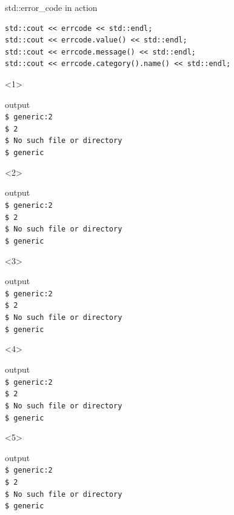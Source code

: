 \documentclass[10pt]{beamer}
\begin{document}
\begin{frame}[fragile]{std::error\_code in action}
\begin{onlyenv}
\begin{verbatim}
std::cout << errcode << std::endl;
std::cout << errcode.value() << std::endl;
std::cout << errcode.message() << std::endl;
std::cout << errcode.category().name() << std::endl;
	\end{verbatim}
	\end{onlyenv}
	
	\hrulefill
	
	\begin{onlyenv}
	\begin{block}{output}
	\texttt{\\
		\$ generic:2 \\
		\$ 2 \\
		\$ No such file or directory \\
		\$ generic}	
	\end{block}
	\end{onlyenv}

	\begin{onlyenv}
	\begin{block}{output}
	\texttt{\\
		\$ \alert{generic:2} \\
		\$ 2 \\
		\$ No such file or directory \\
		\$ generic}	
	\end{block}
	\end{onlyenv}
	
	\begin{onlyenv}
	\begin{block}{output}
	\texttt{\\
		\$ generic:2 \\
		\$ \alert{2} \\
		\$ No such file or directory \\
		\$ generic}	
	\end{block}
	\end{onlyenv}

	\begin{onlyenv}
	\begin{block}{output}
	\texttt{\\
		\$ generic:2 \\
		\$ 2 \\
		\$ \alert{No such file or directory} \\
		\$ generic}	
	\end{block}
	\end{onlyenv}

	\begin{onlyenv}
	\begin{block}{output}
	\texttt{\\
		\$ generic:2 \\
		\$ 2 \\
		\$ No such file or directory \\
		\$ \alert{generic}}
	\end{block}
	\end{onlyenv}

\end{frame}
\end{document}
